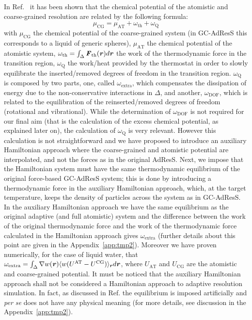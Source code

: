 \documentclass[a4paper,preprint,unsortedaddress]{revtex4-1}
\newcommand{\recheck}[1]{{\color{red} #1}}
\newcommand{\vect}[1]{\textbf{\textit{#1}}}
\newcommand{\dof}{{\textrm{DOF}}}
\newcommand{\AT}{{\textrm{{AT}}}}
\newcommand{\CG}{{\textrm{CG}}}
\newcommand{\thf}{{\textrm{th}}}
\newcommand{\ext}{{\textrm{extra}}}
\newcommand{\thermo}{{\textrm{Q}}}
\begin{document}
In Ref.~\cite{prx} it has been shown that the chemical potential of the atomistic and coarse-grained resolution are related by the following formula: 
\begin{equation}
\mu_{\CG}=\mu_{\AT}+\omega_{\thf}+\omega_{\thermo}
\label{mu}
\end{equation}
with $\mu_{\CG}$ the chemical potential of the coarse-grained system (in GC-AdResS this corresponds to a liquid of generic spheres), $\mu_{\AT}$  the chemical potential of the atomistic system, $\omega_{\thf}=\int_{\Delta}{\vect F}_{\thf}({\vect r})d{\vect r}$ the work of the thermodynamic force in the transition region, $\omega_{\thermo}$ the work/heat provided by the thermostat in order to slowly equilibrate the inserted/removed degrees of freedom in the transition region. $\omega_{\thermo}$ is composed by two parts, one, called $\omega_{\ext}$, which compensates the dissipation of energy due to the non-conservative interactions in $\Delta$, and another, $\omega_{\dof}$, which is related to the equilibration of the reinserted/removed degrees of freedom (rotational and vibrational). \recheck{While the determination of $\omega_{\dof}$ is not required for our final aim (that is the calculation of the excess chemical potential, as explained later on), the calculation of $\omega_{\thermo}$ is very relevant}. However this calculation is not straightforward and we have proposed to introduce an auxiliary Hamiltonian approach where the coarse-grained and atomistic potential are interpolated, and not the forces as in \recheck{the original} AdResS. Next, we impose that the Hamiltonian system must have the same thermodynamic equilibrium of the original force-based GC-AdResS system; this is done by introducing a thermodynamic force in the auxiliary Hamiltonian approach, which, at the target temperature, keeps the density of particles across the system as in GC-AdResS. \recheck{In the auxiliary Hamiltonian approach we have the same equilibrium as the original adaptive (and full atomistic) system  and the difference between the work of the original thermodynamic force and the work of the thermodynamic force calculated in the Hamiltonian approach gives $\omega_{\ext}$ (further details about this point are given in the {Appendix~\ref{app:tmp2}})}. Moreover we have proven numerically, for the case of liquid water, that
  $\omega_{\ext}=\int_{\Delta}\nabla w(\vect r)\langle w( U^{\AT}-U^{\CG})\rangle_{\vect r} d{\vect r}$,
  where $U_{\AT}$ and $U_{\CG}$ are the atomistic and coarse-grained potential.
\recheck{It must be noticed that the auxiliary Hamiltonian approach shall not be considered a Hamiltonian approach to adaptive resolution simulation. In fact, as discussed in Ref.\cite{prx} the equilibrium is imposed artificially and {\it per se} does not have any physical meaning (for more details, see discussion in the {Appendix~\ref{app:tmp2}})}. 
\end{document}
